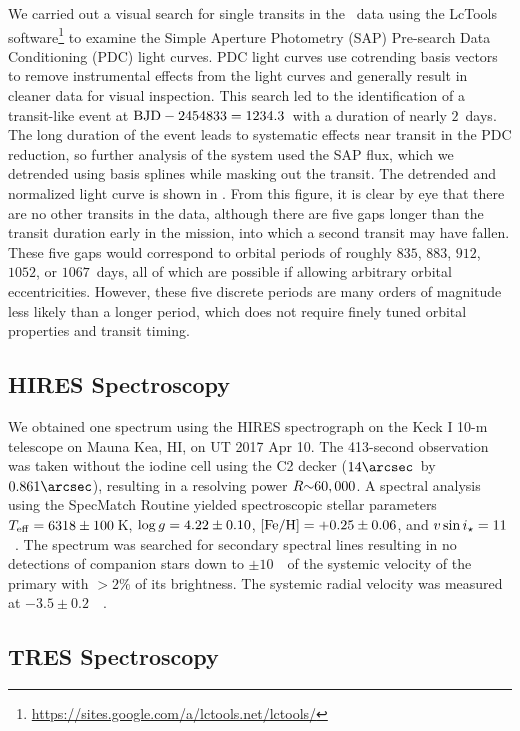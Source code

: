 \documentclass[twocolumn]{aastex63}
\begin{document}
We carried out a visual search for single transits in the \kep\ data using the LcTools software\footnote{\url{https://sites.google.com/a/lctools.net/lctools/}} \citep{schmitt:2019} to examine the Simple Aperture Photometry (SAP) Pre-search Data Conditioning (PDC) light curves. PDC light curves use cotrending basis vectors to remove instrumental effects from the light curves and generally result in cleaner data for visual inspection. This search led to the identification of a transit-like event at ${\rm BJD}-2454833 = 1234.3$\ with a duration of nearly $2$\ days. The long duration of the event leads to systematic effects near transit in the PDC reduction, so further analysis of the system used the SAP flux, which we detrended using basis splines while masking out the transit. The detrended and normalized light curve is shown in . From this figure, it is clear by eye that there are no other transits in the data, although there are five gaps longer than the transit duration early in the mission, into which a second transit may have fallen. These five gaps would correspond to orbital periods of roughly $835$, $883$, $912$, $1052$, or $1067$\ days, all of which are possible if allowing arbitrary orbital eccentricities. However, these five discrete periods are many orders of magnitude less likely than a longer period, which does not require finely tuned orbital properties and transit timing.

\subsection{HIRES Spectroscopy}

We obtained one spectrum using the HIRES spectrograph on the Keck I 10-m telescope on Mauna Kea, HI, on UT 2017 Apr 10. The 413-second observation was taken without the iodine cell using the C2 decker ($14\arcsec$\ by $0.861\arcsec$), resulting in a resolving power $R\mathord{\sim}60,000$.
A spectral analysis using the SpecMatch Routine \citep{petigura:2015} yielded spectroscopic stellar parameters $\teff = 6318 \pm 100$\,K, $\logg = 4.22 \pm 0.10$, $\mbox{$\rm{[Fe/H]}$} = +0.25 \pm 0.06$, and $\vsini = 11$\ \kms. The spectrum was searched for secondary spectral lines \citep{kolbl:2015} resulting in no detections of companion stars down to $\pm 10$\ \kms\ of the systemic velocity of the primary with $>2$\% of its brightness. The systemic radial velocity was measured at $-3.5 \pm 0.2$\ \kms\ \citep{chubak:2012}.

\subsection{TRES Spectroscopy} \label{sec:tres}
\end{document}
